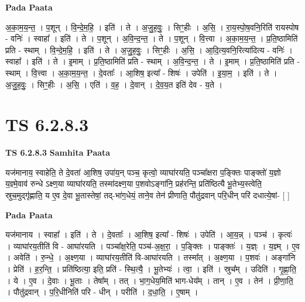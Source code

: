 \documentclass[17pt]{extarticle}
\begin{document}
\textbf{Pada Paata} \newline

अ॒का॒म॒य॒न्त॒ । प॒शून् । वि॒न्दे॒म॒हि॒ । इति॑ । ते । अ॒जु॒ह॒वुः॒ । सिꣳ॒॒हीः । अ॒सि॒ । रा॒य॒स्पो॒ष॒वनि॒रिति॑ रायस्पोष - वनिः॑ । स्वाहा᳚ । इति॑ । ते । प॒शून् । अ॒वि॒न्द॒न्त॒ । ते । प॒शून् । वि॒त्त्वा । अ॒का॒म॒य॒न्त॒ । प्र॒ति॒ष्ठामिति॑ प्रति - स्थाम् । वि॒न्दे॒म॒हि॒ । इति॑ । ते । अ॒जु॒ह॒वुः॒ । सिꣳ॒॒हीः । अ॒सि॒ । आ॒दि॒त्य॒वनि॒रित्या॑दित्य - वनिः॑ । स्वाहा᳚ । इति॑ । ते । इ॒माम् । प्र॒ति॒ष्ठामिति॑ प्रति - स्थाम् । अ॒वि॒न्द॒न्त॒ । ते । इ॒माम् । प्र॒ति॒ष्ठामिति॑ प्रति - स्थाम् । वि॒त्त्वा । अ॒का॒म॒य॒न्त॒ । दे॒वताः᳚ । आ॒शिष॒ इत्या᳚ - शिषः॑ । उपेति॑ । इ॒या॒म॒ । इति॑ । ते । अ॒जु॒ह॒वुः॒ । सिꣳ॒॒हीः । अ॒सि॒ । एति॑ । व॒ह॒ । दे॒वान् । दे॒व॒य॒त इति॑ देव - य॒ते ।  \newline




\section*{ TS 6.2.8.3 }

\textbf{TS 6.2.8.3 } \newline
\textbf{Samhita Paata} \newline

यज॑मानाय॒ स्वाहेति॒ ते दे॒वता॑ आ॒शिष॒ उपा॑य॒न् पञ्च॒ कृत्वो॒ व्याघा॑रयति॒ पञ्चा᳚क्षरा प॒ङ्क्तिः पाङ्क्तो॑ य॒ज्ञो य॒ज्ञ्मे॒वाव॑ रुन्धे ऽक्ष्ण॒या व्याघा॑रयति॒ तस्मा॑दक्ष्ण॒या प॒शवोऽङ्गा॑नि॒ प्रह॑रन्ति॒ प्रति॑ष्ठित्यै भू॒तेभ्य॒स्त्वेति॒ स्रुच॒मुद्गृ॑ह्णाति॒ य ए॒व दे॒वा भू॒तास्तेषां॒ तद्-भा॑ग॒धेयं॒ ताने॒व तेन॑ प्रीणाति॒ पौतु॑द्रवान् परि॒धीन् परि॑ दधात्ये॒षां- [  ] \newline

\textbf{Pada Paata} \newline

यज॑मानाय । स्वाहा᳚ । इति॑ । ते । दे॒वताः᳚ । आ॒शिष॒ इत्या᳚ - शिषः॑ । उपेति॑ । आ॒य॒न्न् । पञ्च॑ । कृत्वः॑ । व्याघा॑रय॒तीति॑ वि - आघा॑रयति । पञ्चा᳚क्ष॒रेति॒ पञ्च॑-अ॒क्ष॒रा॒ । प॒ङ्क्तिः । पाङ्क्तः॑ । य॒ज्ञ्ः । य॒ज्ञ्म् । ए॒व । अवेति॑ । रु॒न्धे॒ । अ॒क्ष्ण॒या । व्याघा॑रय॒तीति॑ वि-आघा॑रयति । तस्मा᳚त् । अ॒क्ष्ण॒या । प॒शवः॑ । अङ्गा॑नि । प्रेति॑ । ह॒र॒न्ति॒ । प्रति॑ष्ठित्या॒ इति॒ प्रति॑ - स्थि॒त्यै॒ । भू॒तेभ्यः॑ । त्वा॒ । इति॑ । स्रुच᳚म् । उदिति॑ । गृ॒ह्णा॒ति॒ । ये । ए॒व । दे॒वाः । भू॒ताः । तेषा᳚म् । तत् । भा॒ग॒धेय॒मिति॑ भाग-धेय᳚म् । तान् । ए॒व । तेन॑ । प्री॒णा॒ति॒ । पौतु॑द्रवान् । प॒रि॒धीनिति॑ परि - धीन् । परीति॑ । द॒धा॒ति॒ । ए॒षाम् ।  \newline
\end{document}
